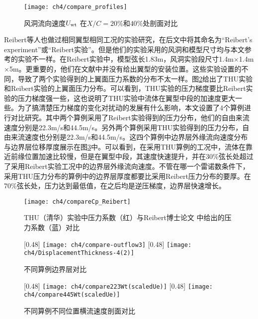 \begin{figure}
\centering
  \texttt{[image: ch4/compare\_profiles]}
\caption{风洞流向速度$U_{\rm{wt}}$ 在$X/C= 20\%$和$40\%$处剖面对比}
\label{f:compare_profiles}
\end{figure}
Reibert等人\cite{Reiberit1996}也做过相同翼型相同工况的实验研究，在后文中将其命名为``Reibert's experiment''或``Reibert实验''。但是他们的实验采用的风洞和模型尺寸均与本文参考的实验不一样。在Reibert实验中，模型弦长1.83m，风洞实验段尺寸1.4m$\times$1.4m$\times$5m。更重要的，他们在文献中并没有给出翼型的安装位置。这些实验设置的不同，导致了两个实验得到的上翼面压力系数的分布不太一样。图\ref{f:CpCompare}给出了THU实验和Reibert实验的上翼面压力分布。可以看到，THU实验的压力梯度要比Reibert实验的压力梯度强一些，这也说明了THU实验中流体在翼型中段的加速度更大一些。为了搞清楚压力梯度的变化对扰动的发展有什么影响，本文设置了4个算例进行对比研究。其中两个算例采用了Reibert实验得到的压力分布，他们的自由来流速度分别是22.3m/s和44.5m/s。另外两个算例采用THU实验得到的压力分布，自由来流速度也分别是22.3m/s和44.5m/s。这四个算例中边界层外缘流向速度分布与边界层位移厚度展示在图\ref{fig:CompOutFlow}中。可以看到，在采用THU算例的工况中，流体在靠近前缘位置加速比较慢，但是在翼型中段，其速度快速提升，并在30\%弦长处超过了采用Reibert实验工况中的边界层外缘流向速度。不管在哪一个雷诺数条件下，采用THU压力分布的算例中的边界层厚度都要比采用Reibert压力分布的要厚。在70\%弦长处，压力达到最低值，在之后均是逆压梯度，边界层快速增长。
\begin{figure}[htb]
\centering
  \texttt{[image: ch4/compareCp\_Reibert]}
  \caption{THU（清华）实验中压力系数（红）与Reibert博士论文 \cite{Reiberit1996}中给出的压力系数（蓝）对比}\label{f:CpCompare}
\end{figure}
\begin{figure}[htb]
\centering
{}[0.48\linewidth] %
    {\texttt{[image: ch4/compare-outflow3]}}
[0.48\linewidth]%
    {\texttt{[image: ch4/DisplacementThickness-4(2)]}}
\caption{不同算例边界层对比}
\label{fig:CompOutFlow} %
\end{figure}
\begin{figure}[htb]
\centering
{}[0.48\linewidth]%
{\texttt{[image: ch4/compare223Wt(scaledUe)]}}
 [0.48\linewidth]%
{\texttt{[image: ch4/compare445Wt(scaledUe)]}}
\caption{不同算例不同位置横流速度剖面对比}
\label{fig:CompCrossProfiles} %
\end{figure}

